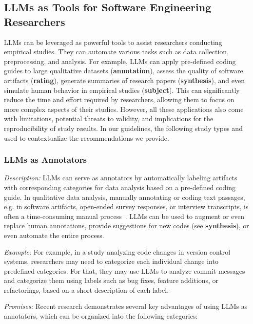 \documentclass[11pt]{article}
\begin{document}
\justifying

\subsection{LLMs as Tools for Software Engineering Researchers}

LLMs can be leveraged as powerful tools to assist researchers conducting empirical studies.
They can automate various tasks such as data collection, preprocessing, and analysis.
For example, LLMs can apply pre-defined coding guides to large qualitative datasets (\textbf{annotation}), assess the quality of software artifacts (\textbf{rating}), generate summaries of research papers (\textbf{synthesis}), and even simulate human behavior in empirical studies (\textbf{subject}).
This can significantly reduce the time and effort required by researchers, allowing them to focus on more complex aspects of their studies.
However, all these applications also come with limitations, potential threats to validity, and implications for the reproducibility of study results.
In our guidelines, the following study types and used to contextualize the recommendations we provide.


\subsubsection{LLMs as Annotators}

\emph{Description:} LLMs can serve as annotators by automatically labeling artifacts with corresponding categories for data analysis based on a pre-defined coding guide.
In qualitative data analysis, manually annotating or coding text passages, e.g. in software artifacts, open-ended survey responses, or interview transcripts, is often a time-consuming manual process~\cite{DBLP:journals/ase/BanoHZT24}.
LLMs can be used to augment or even replace human annotations, provide suggestions for new codes (see \textbf{synthesis}), or even automate the entire process.

\emph{Example:} For example, in a study analyzing code changes in version control systems, researchers may need to categorize each individual change into predefined categories.
For that, they may use LLMs to analyze commit messages and categorize them using labels such as bug fixes, feature additions, or refactorings, based on a short description of each label.

\emph{Promises:} Recent research demonstrates several key advantages of using LLMs as annotators, which can be organized into the following categories:
\end{document}
